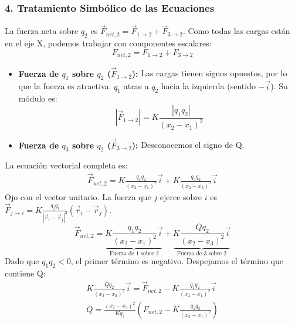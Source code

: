 \subsubsection*{4. Tratamiento Simbólico de las Ecuaciones}
La fuerza neta sobre $q_2$ es $\vec{F}_{net,2} = \vec{F}_{1 \to 2} + \vec{F}_{3 \to 2}$. Como todas las cargas están en el eje X, podemos trabajar con componentes escalares:
$$ F_{net,2} = F_{1 \to 2} + F_{3 \to 2} $$
\begin{itemize}
    \item \textbf{Fuerza de $q_1$ sobre $q_2$ ($\vec{F}_{1 \to 2}$):} Las cargas tienen signos opuestos, por lo que la fuerza es atractiva. $q_1$ atrae a $q_2$ hacia la izquierda (sentido $-\vec{i}$). Su módulo es:
    $$ |\vec{F}_{1 \to 2}| = K \frac{|q_1 q_2|}{(x_2 - x_1)^2} $$
    \item \textbf{Fuerza de $q_3$ sobre $q_2$ ($\vec{F}_{3 \to 2}$):} Desconocemos el signo de Q.
\end{itemize}
La ecuación vectorial completa es:
\begin{gather}
    \vec{F}_{net,2} = K \frac{q_1 q_2}{(x_2-x_1)^2} \vec{i} + K \frac{q_3 q_2}{(x_2-x_3)^2} \vec{i}
\end{gather}
Ojo con el vector unitario. La fuerza que $j$ ejerce sobre $i$ es $\vec{F}_{j \to i} = K \frac{q_j q_i}{|\vec{r}_i - \vec{r}_j|^3} (\vec{r}_i - \vec{r}_j)$.
$$ \vec{F}_{net,2} = \underbrace{K \frac{q_1 q_2}{(x_2-x_1)^2} \vec{i}}_{\text{Fuerza de 1 sobre 2}} + \underbrace{K \frac{Q q_2}{(x_2-x_3)^2} \vec{i}}_{\text{Fuerza de 3 sobre 2}} $$
Dado que $q_1q_2 < 0$, el primer término es negativo. Despejamos el término que contiene Q:
\begin{gather}
    K \frac{Q q_2}{(x_2-x_3)^2} \vec{i} = \vec{F}_{net,2} - K \frac{q_1 q_2}{(x_2-x_1)^2} \vec{i} \\
    Q = \frac{(x_2-x_3)^2}{K q_2} \left( F_{net,2} - K \frac{q_1 q_2}{(x_2-x_1)^2} \right)
\end{gather}

